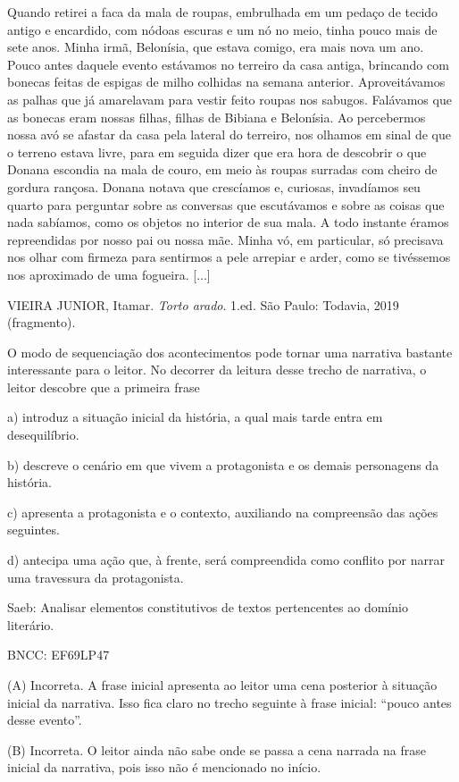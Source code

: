 Quando retirei a faca da mala de roupas, embrulhada em um pedaço de
tecido antigo e encardido, com nódoas escuras e um nó no meio, tinha
pouco mais de sete anos. Minha irmã, Belonísia, que estava comigo, era
mais nova um ano. Pouco antes daquele evento estávamos no terreiro da
casa antiga, brincando com bonecas feitas de espigas de milho colhidas
na semana anterior. Aproveitávamos as palhas que já amarelavam para
vestir feito roupas nos sabugos. Falávamos que as bonecas eram nossas
filhas, filhas de Bibiana e Belonísia. Ao percebermos nossa avó se
afastar da casa pela lateral do terreiro, nos olhamos em sinal de que o
terreno estava livre, para em seguida dizer que era hora de descobrir o
que Donana escondia na mala de couro, em meio às roupas surradas com
cheiro de gordura rançosa. Donana notava que crescíamos e, curiosas,
invadíamos seu quarto para perguntar sobre as conversas que escutávamos
e sobre as coisas que nada sabíamos, como os objetos no interior de sua
mala. A todo instante éramos repreendidas por nosso pai ou nossa mãe.
Minha vó, em particular, só precisava nos olhar com firmeza para
sentirmos a pele arrepiar e arder, como se tivéssemos nos aproximado de
uma fogueira. {[}...{]}

VIEIRA JUNIOR, Itamar. \emph{Torto arado}. 1.ed. São Paulo: Todavia,
2019 (fragmento).

O modo de sequenciação dos acontecimentos pode tornar uma narrativa
bastante interessante para o leitor. No decorrer da leitura desse trecho
de narrativa, o leitor descobre que a primeira frase

a) introduz a situação inicial da história, a qual mais tarde entra em
desequilíbrio.

b) descreve o cenário em que vivem a protagonista e os demais
personagens da história.

c) apresenta a protagonista e o contexto, auxiliando na compreensão das
ações seguintes.

d) antecipa uma ação que, à frente, será compreendida como conflito por
narrar uma travessura da protagonista.

Saeb: Analisar elementos constitutivos de textos pertencentes ao domínio
literário.

BNCC: EF69LP47

(A) Incorreta. A frase inicial apresenta ao leitor uma cena posterior à
situação inicial da narrativa. Isso fica claro no trecho seguinte à
frase inicial: ``pouco antes desse evento''.

(B) Incorreta. O leitor ainda não sabe onde se passa a cena narrada na
frase inicial da narrativa, pois isso não é mencionado no início.

